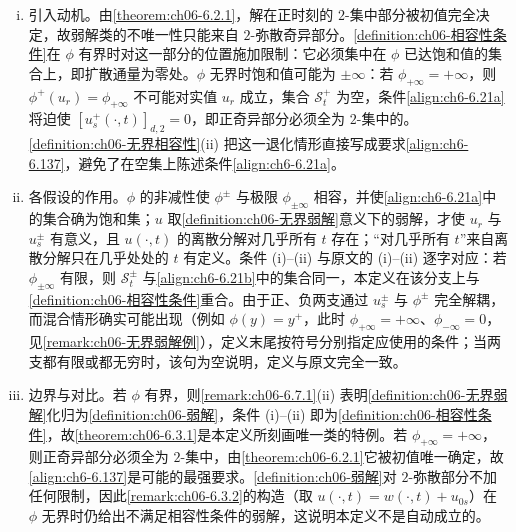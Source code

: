 \documentclass[../../main.tex]{subfiles}%
\begin{document}
\begin{remark}\label{remark:ch06-无界相容动机}
\begin{enumerate}[(i)]
\item 引入动机。由\cref{theorem:ch06-6.2.1}，解在正时刻的 $2$-集中部分被初值完全决定，故弱解类的不唯一性只能来自 $2$-弥散奇异部分。\cref{definition:ch06-相容性条件}在 $\phi$ 有界时对这一部分的位置施加限制：它必须集中在 $\phi$ 已达饱和值的集合上，即扩散通量为零处。$\phi$ 无界时饱和值可能为 $\pm\infty$：若 $\phi_{+\infty}=+\infty$，则 $\phi^+(u_r)=\phi_{+\infty}$ 不可能对实值 $u_r$ 成立，集合 $\mathscr{S}^+_t$ 为空，条件\eqref{align:ch6-6.21a}将迫使 $[u^+_s(\cdot,t)]_{d,2}=0$，即正奇异部分必须全为 $2$-集中的。\cref{definition:ch06-无界相容性}(ii) 把这一退化情形直接写成要求\eqref{align:ch6-6.137}，避免了在空集上陈述条件\eqref{align:ch6-6.21a}。

\item 各假设的作用。$\phi$ 的非减性使 $\phi^\pm$ 与极限 $\phi_{\pm\infty}$ 相容，并使\eqref{align:ch6-6.21a}中的集合确为饱和集；$u$ 取\cref{definition:ch06-无界弱解}意义下的弱解，才使 $u_r$ 与 $u^\pm_s$ 有意义，且 $u(\cdot,t)$ 的离散分解对几乎所有 $t$ 存在；“对几乎所有 $t$”来自离散分解只在几乎处处的 $t$ 有定义。条件 (i)--(ii) 与原文的 (i)--(ii) 逐字对应：若 $\phi_{\pm\infty}$ 有限，则 $\mathscr{S}^\pm_t$ 与\eqref{align:ch6-6.21b}中的集合同一，本定义在该分支上与\cref{definition:ch06-相容性条件}重合。由于正、负两支通过 $u^\pm_s$ 与 $\phi^\pm$ 完全解耦，而混合情形确实可能出现（例如 $\phi(y)=y^+$，此时 $\phi_{+\infty}=+\infty$、$\phi_{-\infty}=0$，见\cref{remark:ch06-无界弱解例}），定义末尾按符号分别指定应使用的条件；当两支都有限或都无穷时，该句为空说明，定义与原文完全一致。

\item 边界与对比。若 $\phi$ 有界，则\cref{remark:ch06-6.7.1}(ii) 表明\cref{definition:ch06-无界弱解}化归为\cref{definition:ch06-弱解}，条件 (i)--(ii) 即为\cref{definition:ch06-相容性条件}，故\cref{theorem:ch06-6.3.1}是本定义所刻画唯一类的特例。若 $\phi_{+\infty}=+\infty$，则正奇异部分必须全为 $2$-集中，由\cref{theorem:ch06-6.2.1}它被初值唯一确定，故\eqref{align:ch6-6.137}是可能的最强要求。\cref{definition:ch06-弱解}对 $2$-弥散部分不加任何限制，因此\cref{remark:ch06-6.3.2}的构造（取 $u(\cdot,t)=w(\cdot,t)+u_{0s}$）在 $\phi$ 无界时仍给出不满足相容性条件的弱解，这说明本定义不是自动成立的。
\end{enumerate}
\end{remark}
\end{document}
